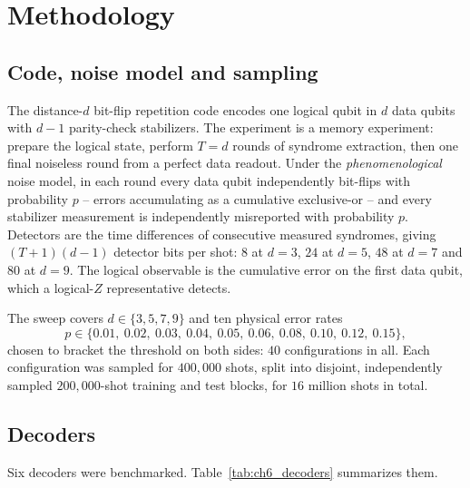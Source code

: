 \documentclass[Thesis.tex]{subfiles}
\begin{document}
\section{Methodology}\label{sec:ch6_method}

\subsection{Code, noise model and sampling}

The distance-$d$ bit-flip repetition code encodes one logical qubit in $d$ data
qubits with $d-1$ parity-check stabilizers. The experiment is a memory experiment:
prepare the logical state, perform $T = d$ rounds of syndrome extraction, then one
final noiseless round from a perfect data readout. Under the
\emph{phenomenological} noise model, in each round every data qubit independently
bit-flips with probability $p$ -- errors accumulating as a cumulative exclusive-or --
and every stabilizer measurement is independently misreported with probability $p$.
Detectors are the time differences of consecutive measured syndromes, giving
$(T+1)(d-1)$ detector bits per shot: $8$ at $d = 3$, $24$ at $d = 5$, $48$ at
$d = 7$ and $80$ at $d = 9$. The logical observable is the cumulative error on the
first data qubit, which a logical-$Z$ representative detects.

The sweep covers $d \in \{3, 5, 7, 9\}$ and ten physical error rates
\[
  p \in \{0.01,\ 0.02,\ 0.03,\ 0.04,\ 0.05,\ 0.06,\ 0.08,\ 0.10,\ 0.12,\ 0.15\},
\]
chosen to
bracket the threshold on both sides: $40$ configurations in all. Each configuration
was sampled for $400{,}000$ shots, split into disjoint, independently sampled
$200{,}000$-shot training and test blocks, for $16$ million shots in total.

\subsection{Decoders}

Six decoders were benchmarked. Table~\ref{tab:ch6_decoders} summarizes them.
\end{document}
